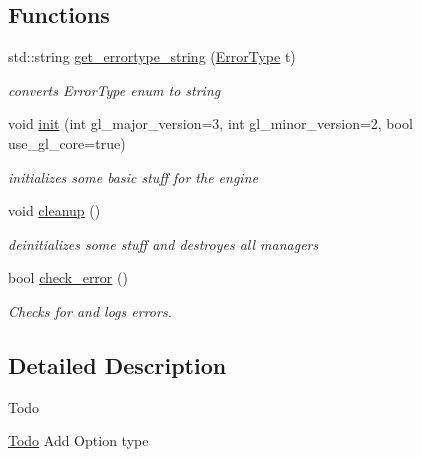 \subsection*{Functions}
\begin{DoxyCompactItemize}
\item 
\mbox{\label{namespacenta_a426f7af8e14776cbfdac881f2b21aa7d}} 
std\+::string \hyperlink{namespacenta_a426f7af8e14776cbfdac881f2b21aa7d}{get\+\_\+errortype\+\_\+string} (\hyperlink{namespacenta_a1ddeff35318678e360dfa44ca9577b16}{Error\+Type} t)
\begin{DoxyCompactList}\small\item\em converts Error\+Type enum to string \end{DoxyCompactList}\item 
\mbox{\label{namespacenta_a45f05b09d7a4f72d658e70dad161391e}} 
void \hyperlink{namespacenta_a45f05b09d7a4f72d658e70dad161391e}{init} (int gl\+\_\+major\+\_\+version=3, int gl\+\_\+minor\+\_\+version=2, bool use\+\_\+gl\+\_\+core=true)
\begin{DoxyCompactList}\small\item\em initializes some basic stuff for the engine \end{DoxyCompactList}\item 
\mbox{\label{namespacenta_a17dc16b021d0dec3749e422b95d39350}} 
void \hyperlink{namespacenta_a17dc16b021d0dec3749e422b95d39350}{cleanup} ()
\begin{DoxyCompactList}\small\item\em deinitializes some stuff and destroyes all managers \end{DoxyCompactList}\item 
\mbox{\label{namespacenta_a65c4ac3e24918c1a26025984c474b7c8}} 
bool \hyperlink{namespacenta_a65c4ac3e24918c1a26025984c474b7c8}{check\+\_\+error} ()
\begin{DoxyCompactList}\small\item\em Checks for and logs errors. \end{DoxyCompactList}\end{DoxyCompactItemize}


\subsection{Detailed Description}
\begin{DoxyRefDesc}{Todo}
\item[\hyperlink{todo__todo000002}{Todo}]Add Option type \end{DoxyRefDesc}


